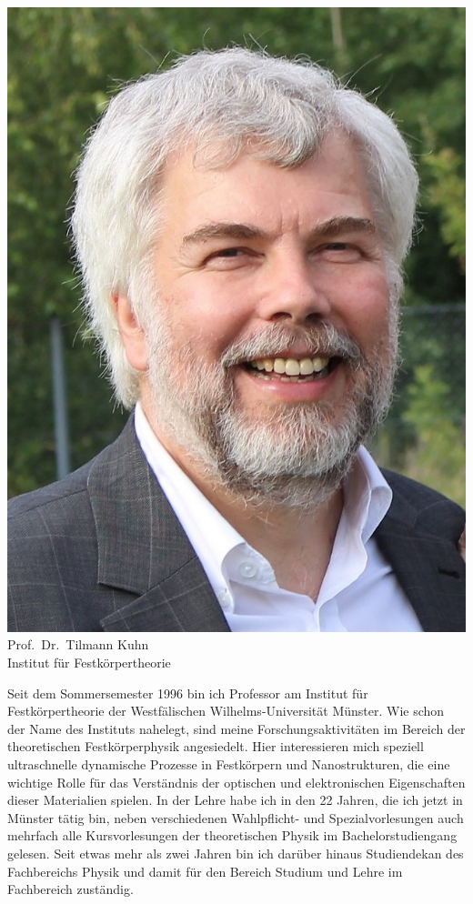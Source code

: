 \newpage

\begin{multicols}{2}
\begin{center}
\includegraphics[width=0.71\columnwidth]{res/vorstellungsfotos/kuhn.jpg}\\
\smallskip
Prof.\ Dr.\ Tilmann Kuhn\\
Institut für Festkörpertheorie
\end{center}

Seit dem Sommersemester 1996 bin ich Professor am Institut für Festkörpertheorie der Westfälischen Wilhelms-Universität Münster. Wie schon der Name des Instituts nahelegt, sind meine Forschungsaktivitäten im Bereich der theoretischen Festkörperphysik angesiedelt. Hier interessieren mich speziell ultraschnelle dynamische Prozesse in Festkörpern und Nanostrukturen, die eine wichtige Rolle für das Verständnis der optischen und elektronischen Eigenschaften dieser Materialien spielen. In der Lehre habe ich in den 22 Jahren, die ich jetzt in Münster tätig bin, neben verschiedenen Wahlpflicht- und Spezialvorlesungen auch mehrfach alle Kursvorlesungen der theoretischen Physik im Bachelorstudiengang gelesen. Seit etwas mehr als zwei Jahren bin ich darüber hinaus Studiendekan des Fachbereichs Physik und damit für den Bereich Studium und Lehre im Fachbereich zuständig.


\end{multicols}
